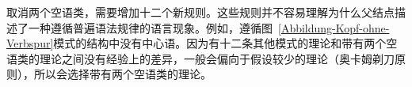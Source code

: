 \zl
取消两个空语类，需要增加十二个新规则。这些规则并不容易理解为什么父结点描述了一种遵循普遍语法规律的语言现象。例如，遵循图~\ref{Abbildung-Kopf-ohne-Verbspur}模式的结构中没有中心语。因为有十二条其他模式的理论和带有两个空语类的理论之间没有经验上的差异，一般会偏向于假设较少的理论（奥卡姆剃刀原则），所以会选择带有两个空语类的理论。

